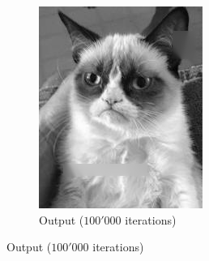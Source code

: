 \documentclass{paper}
\begin{document}
\begin{figure}[ht]
\begin{subfigure}[h]{0.45\textwidth}
	\includegraphics[width=\textwidth]{cat-iter100000-lambda1000-alpha0_0005}
	\caption*{Output ($100'000$ iterations)}
\end{subfigure}


\end{figure}
\end{document}
